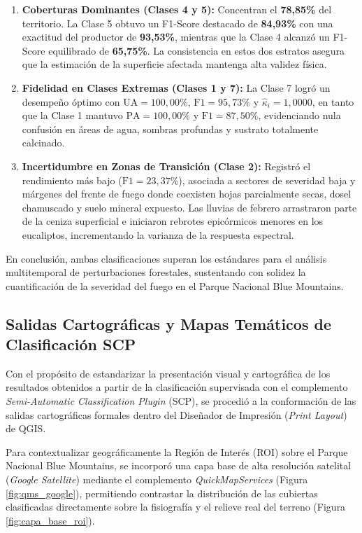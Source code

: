\documentclass[12pt]{article}
\begin{document}
\begin{enumerate}
    \item \textbf{Coberturas Dominantes (Clases 4 y 5):} Concentran el \textbf{78,85\%} del territorio. La Clase 5 obtuvo un F1-Score destacado de \textbf{84,93\%} con una exactitud del productor de \textbf{93,53\%}, mientras que la Clase 4 alcanzó un F1-Score equilibrado de \textbf{65,75\%}. La consistencia en estos dos estratos asegura que la estimación de la superficie afectada mantenga alta validez física.
    
    \item \textbf{Fidelidad en Clases Extremas (Clases 1 y 7):} La Clase 7 logró un desempeño óptimo con $\text{UA} = 100{,}00\%$, $\text{F1} = 95{,}73\%$ y $\hat{\kappa}_i = 1{,}0000$, en tanto que la Clase 1 mantuvo $\text{PA} = 100{,}00\%$ y $\text{F1} = 87{,}50\%$, evidenciando nula confusión en áreas de agua, sombras profundas y sustrato totalmente calcinado.
    
    \item \textbf{Incertidumbre en Zonas de Transición (Clase 2):} Registró el rendimiento más bajo ($\text{F1} = 23{,}37\%$), asociada a sectores de severidad baja y márgenes del frente de fuego donde coexisten hojas parcialmente secas, dosel chamuscado y suelo mineral expuesto. Las lluvias de febrero arrastraron parte de la ceniza superficial e iniciaron rebrotes epicórmicos menores en los eucaliptos, incrementando la varianza de la respuesta espectral.
\end{enumerate}

En conclusión, ambas clasificaciones superan los estándares para el análisis multitemporal de perturbaciones forestales, sustentando con solidez la cuantificación de la severidad del fuego en el Parque Nacional Blue Mountains.

\subsection{Salidas Cartográficas y Mapas Temáticos de Clasificación SCP}

Con el propósito de estandarizar la presentación visual y cartográfica de los resultados obtenidos a partir de la clasificación supervisada con el complemento \textit{Semi-Automatic Classification Plugin} (SCP), se procedió a la conformación de las salidas cartográficas formales dentro del Diseñador de Impresión (\textit{Print Layout}) de QGIS.

Para contextualizar geográficamente la Región de Interés (ROI) sobre el Parque Nacional Blue Mountains, se incorporó una capa base de alta resolución satelital (\textit{Google Satellite}) mediante el complemento \textit{QuickMapServices} (Figura \ref{fig:qms_google}), permitiendo contrastar la distribución de las cubiertas clasificadas directamente sobre la fisiografía y el relieve real del terreno (Figura \ref{fig:capa_base_roi}).
\end{document}
